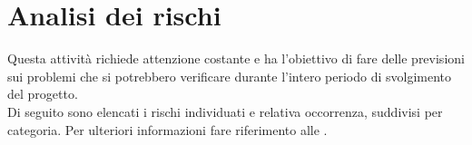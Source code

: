\section{Analisi dei rischi}

Questa attività richiede attenzione costante e ha l'obiettivo di fare delle previsioni sui problemi che si potrebbero verificare durante l'intero periodo di svolgimento del progetto. \\
Di seguito sono elencati i rischi individuati e relativa occorrenza, suddivisi per categoria. Per ulteriori informazioni fare riferimento alle .

\newlength\colA\setlength\colA{2cm}
\newlength\colB\setlength\colB{7cm}
\newlength\colC\setlength\colC{6cm}
\newlength\colD\setlength\colD{0.9cm}
\newlength\total\setlength\total{\dimexpr\colA+\colB+\colC+\colD+6\tabcolsep\relax}
\renewcommand{\arraystretch}{2}%
